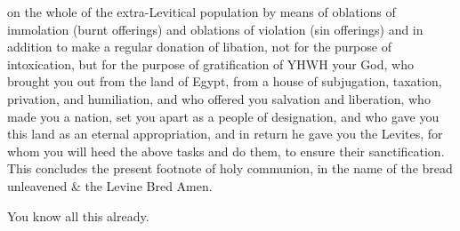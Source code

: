 {{{{{                        on the whole of the extra-Levitical population
                        by means of
                        oblations of immolation (burnt offerings)
                        and
                        oblations of violation (sin offerings)
                        and in addition to make a regular donation of libation,
                        not for the purpose of intoxication,
                        but for the purpose of gratification of
                        YHWH your God, who brought you out from the land of Egypt,
                        from a house of subjugation, taxation, privation, and humiliation,
                        and who offered you salvation and liberation,
                        who made you a nation, set you apart as a people of designation,
                        and who gave you this land as an eternal appropriation,
                        and in return he gave you the Levites, for whom you
                        will heed the above tasks and do them, to ensure their sanctification.
                        This concludes the present footnote of
                        holy communion,
                        in the name of the
                        bread unleavened \& the
                        Levine Bred
                        \;%
                        Amen.
                    }}%
                }

                You know all this already.




}}
